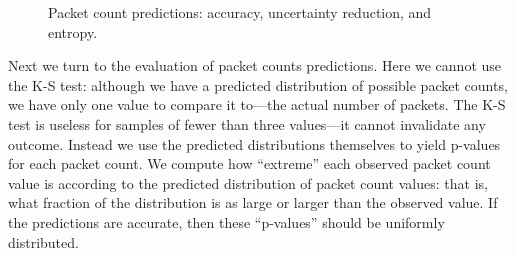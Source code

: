 \documentclass[conference]{IEEEtran}
\begin{document}
\begin{figure}[t]
\vspace{-1em}
\begin{center}
\caption{Packet count predictions: accuracy, uncertainty reduction, and entropy.}
\end{center}
\vspace{-2em}
\end{figure}

Next we turn to the evaluation of packet counts predictions.
Here we cannot use the K-S test:
although we have a predicted distribution of possible packet counts, we have only one value to compare it to---the actual number of packets.
The K-S test is useless for samples of fewer than three values---it cannot invalidate any outcome.
Instead we use the predicted distributions themselves to yield p-values for each packet count.
We compute how ``extreme'' each observed packet count value is according to the predicted distribution of packet count values:
that is, what fraction of the distribution is as large or larger than the observed value.
If the predictions are accurate, then these ``p-values'' should be uniformly distributed.
\end{document}
